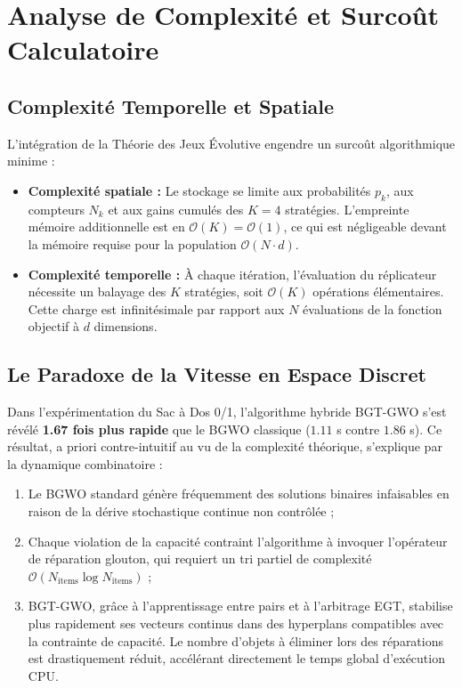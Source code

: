 \section{Analyse de Complexité et Surcoût Calculatoire}

\subsection{Complexité Temporelle et Spatiale}
L'intégration de la Théorie des Jeux Évolutive engendre un surcoût algorithmique minime :
\begin{itemize}[label=\textbullet]
    \item \textbf{Complexité spatiale :} Le stockage se limite aux probabilités $p_k$, aux compteurs $N_k$ et aux gains cumulés des $K = 4$ stratégies. L'empreinte mémoire additionnelle est en $\mathcal{O}(K) = \mathcal{O}(1)$, ce qui est négligeable devant la mémoire requise pour la population $\mathcal{O}(N \cdot d)$.
    \item \textbf{Complexité temporelle :} À chaque itération, l'évaluation du réplicateur nécessite un balayage des $K$ stratégies, soit $\mathcal{O}(K)$ opérations élémentaires. Cette charge est infinitésimale par rapport aux $N$ évaluations de la fonction objectif à $d$ dimensions.
\end{itemize}

\subsection{Le Paradoxe de la Vitesse en Espace Discret}
Dans l'expérimentation du Sac à Dos 0/1, l'algorithme hybride BGT-GWO s'est révélé \textbf{1.67 fois plus rapide} que le BGWO classique ($1.11$ s contre $1.86$ s). Ce résultat, a priori contre-intuitif au vu de la complexité théorique, s'explique par la dynamique combinatoire :
\begin{enumerate}[label=\textbf{\arabic*.}]
    \item Le BGWO standard génère fréquemment des solutions binaires infaisables en raison de la dérive stochastique continue non contrôlée ;
    \item Chaque violation de la capacité contraint l'algorithme à invoquer l'opérateur de réparation glouton, qui requiert un tri partiel de complexité $\mathcal{O}(N_{\text{items}} \log N_{\text{items}})$ ;
    \item BGT-GWO, grâce à l'apprentissage entre pairs et à l'arbitrage EGT, stabilise plus rapidement ses vecteurs continus dans des hyperplans compatibles avec la contrainte de capacité. Le nombre d'objets à éliminer lors des réparations est drastiquement réduit, accélérant directement le temps global d'exécution CPU.
\end{enumerate}

